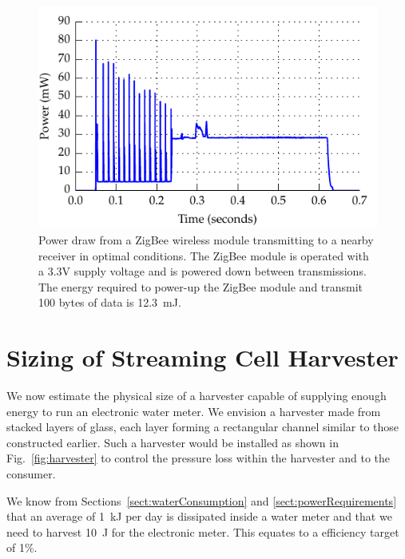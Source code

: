 \documentclass[10pt,final,journal]{IEEEtran}
\begin{document}
        \begin{figure}
            \begin{center}
            \includegraphics[width=\linewidth]{graph_XbeePower_reduced}
            \end{center}
            \caption{Power draw from a ZigBee wireless module transmitting to a nearby receiver in optimal conditions. The ZigBee module is operated with a 3.3V supply voltage and is powered down between transmissions. The energy required to power-up the ZigBee module and transmit 100 bytes of data is \SI{12.3}{\milli\joule}.}
            \label{fig:xbeePower}
        \end{figure}

    \section{Sizing of Streaming Cell Harvester}
        \label{sect:harvesterSize}
        We now estimate the physical size of a harvester capable of supplying enough energy to run an electronic water meter.
        We envision a harvester made from stacked layers of glass, each layer forming a rectangular channel similar to those constructed earlier.
        Such a harvester would be installed as shown in Fig.~\ref{fig:harvester} to control the pressure loss within the harvester and to the consumer.


        We know from Sections~\ref{sect:waterConsumption} and \ref{sect:powerRequirements} that an average of \SI{1}{\kilo\joule} per day is dissipated inside a water meter and that we need to harvest \SI{10}{\joule} for the electronic meter.
        This equates to a efficiency target of 1\%.
\end{document}

